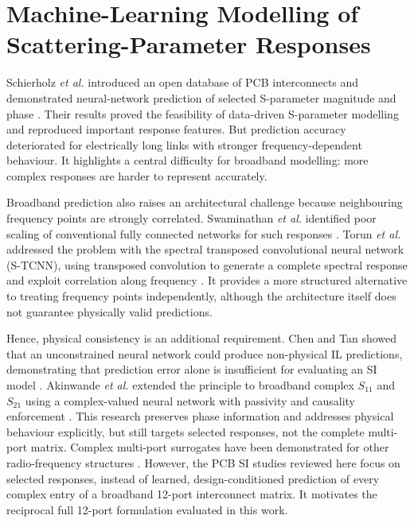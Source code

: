 \section{Machine-Learning Modelling of Scattering-Parameter Responses}
\label{sec:related-work}

Schierholz \textit{et al.} introduced an open database of PCB interconnects and
demonstrated neural-network prediction of selected S-parameter magnitude and
phase \cite{schierholz2021sipi}. Their results proved the feasibility of data-driven
S-parameter modelling and reproduced important response features. But prediction
accuracy deteriorated for electrically long links with stronger frequency-dependent
behaviour. It highlights a central difficulty for broadband modelling: more complex
responses are harder to represent
accurately.

Broadband prediction also raises an architectural challenge because neighbouring
frequency points are strongly correlated. Swaminathan \textit{et al.} identified
poor scaling of conventional fully connected networks for such responses
\cite{swaminathan2020demystifying}. Torun \textit{et al.} addressed the problem with
the spectral transposed convolutional neural network (S-TCNN), using transposed
convolution to generate a complete spectral response and exploit correlation
along frequency \cite{torun2019spectral}. It provides a more structured
alternative to treating frequency points independently, although the
architecture itself does not guarantee physically valid predictions.

Hence, physical consistency is an additional requirement. Chen and Tan
showed that an unconstrained neural network could produce non-physical
IL predictions, demonstrating that prediction error alone is
insufficient for evaluating an SI model \cite{chen2021physics}. Akinwande
\textit{et al.} extended the principle to broadband complex $S_{11}$ and
$S_{21}$ using a complex-valued neural network with passivity and causality
enforcement \cite{akinwande2024complex}. This research preserves phase information and
addresses physical behaviour explicitly, but still targets selected responses, not the
complete multi-port matrix. Complex multi-port surrogates have been demonstrated for
other radio-frequency structures \cite{karahan2024multiport}. However, the PCB SI
studies reviewed here focus on selected responses, instead of learned,
design-conditioned prediction of every complex entry of a broadband 12-port interconnect
matrix. It motivates the reciprocal full 12-port formulation evaluated in this work.
